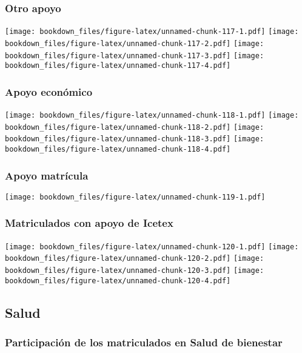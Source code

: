\documentclass[]{article}
\theoremstyle{definition}
\theoremstyle{definition}
\theoremstyle{definition}
\theoremstyle{remark}
\begin{document}
\subsubsection{Otro apoyo}\label{otro-apoyo}

\texttt{[image: bookdown\_files/figure-latex/unnamed-chunk-117-1.pdf]}
\texttt{[image: bookdown\_files/figure-latex/unnamed-chunk-117-2.pdf]}
\texttt{[image: bookdown\_files/figure-latex/unnamed-chunk-117-3.pdf]}
\texttt{[image: bookdown\_files/figure-latex/unnamed-chunk-117-4.pdf]}

\subsubsection{Apoyo económico}\label{apoyo-economico}

\texttt{[image: bookdown\_files/figure-latex/unnamed-chunk-118-1.pdf]}
\texttt{[image: bookdown\_files/figure-latex/unnamed-chunk-118-2.pdf]}
\texttt{[image: bookdown\_files/figure-latex/unnamed-chunk-118-3.pdf]}
\texttt{[image: bookdown\_files/figure-latex/unnamed-chunk-118-4.pdf]}

\subsubsection{Apoyo matrícula}\label{apoyo-matricula}

\texttt{[image: bookdown\_files/figure-latex/unnamed-chunk-119-1.pdf]}

\subsubsection{Matriculados con apoyo de
Icetex}\label{matriculados-con-apoyo-de-icetex}

\texttt{[image: bookdown\_files/figure-latex/unnamed-chunk-120-1.pdf]}
\texttt{[image: bookdown\_files/figure-latex/unnamed-chunk-120-2.pdf]}
\texttt{[image: bookdown\_files/figure-latex/unnamed-chunk-120-3.pdf]}
\texttt{[image: bookdown\_files/figure-latex/unnamed-chunk-120-4.pdf]}

\subsection{Salud}\label{salud}

\subsubsection{Participación de los matriculados en Salud de
bienestar}\label{participacion-de-los-matriculados-en-salud-de-bienestar}
\end{document}
